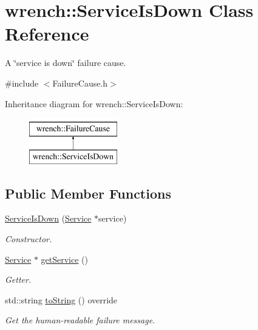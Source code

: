 \hypertarget{classwrench_1_1_service_is_down}{}\section{wrench\+:\+:Service\+Is\+Down Class Reference}
\label{classwrench_1_1_service_is_down}


A \char`\"{}service is down\char`\"{} failure cause.  




{\ttfamily \#include $<$Failure\+Cause.\+h$>$}

Inheritance diagram for wrench\+:\+:Service\+Is\+Down\+:\begin{figure}[H]
\begin{center}
\leavevmode
\includegraphics[height=2.000000cm]{classwrench_1_1_service_is_down}
\end{center}
\end{figure}
\subsection*{Public Member Functions}
\begin{DoxyCompactItemize}
\item 
\hyperlink{classwrench_1_1_service_is_down_aa126c61019d1c3131c8ac71454c30ef5}{Service\+Is\+Down} (\hyperlink{classwrench_1_1_service}{Service} $\ast$service)
\begin{DoxyCompactList}\small\item\em Constructor. \end{DoxyCompactList}\item 
\hyperlink{classwrench_1_1_service}{Service} $\ast$ \hyperlink{classwrench_1_1_service_is_down_a1e92883f2634958f1af834d791097c90}{get\+Service} ()
\begin{DoxyCompactList}\small\item\em Getter. \end{DoxyCompactList}\item 
std\+::string \hyperlink{classwrench_1_1_service_is_down_a29dbb2d3dd1b5d6a47536bab974b7151}{to\+String} () override
\begin{DoxyCompactList}\small\item\em Get the human-\/readable failure message. \end{DoxyCompactList}\end{DoxyCompactItemize}
